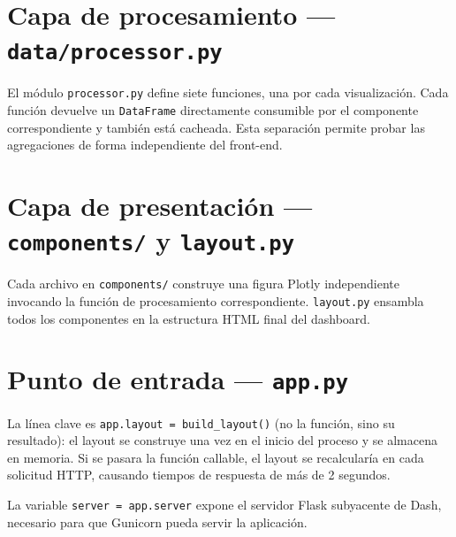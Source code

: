 \documentclass[a4paper,12pt]{report}
\numberwithin{equation}{chapter}
\numberwithin{figure}{chapter}
\numberwithin{table}{chapter}
\begin{document}


\section{Capa de procesamiento — \texttt{data/processor.py}}

El módulo \texttt{processor.py} define siete funciones, una por cada visualización. Cada función devuelve un \texttt{DataFrame} directamente consumible por el componente correspondiente y también está cacheada. Esta separación permite probar las agregaciones de forma independiente del front-end.



\section{Capa de presentación — \texttt{components/} y \texttt{layout.py}}

Cada archivo en \texttt{components/} construye una figura Plotly independiente invocando la función de procesamiento correspondiente. \texttt{layout.py} ensambla todos los componentes en la estructura HTML final del dashboard.

\section{Punto de entrada — \texttt{app.py}}



La línea clave es \texttt{app.layout = build\_layout()} (no la función, sino su resultado): el layout se construye una vez en el inicio del proceso y se almacena en memoria. Si se pasara la función callable, el layout se recalcularía en cada solicitud HTTP, causando tiempos de respuesta de más de 2 segundos.

La variable \texttt{server = app.server} expone el servidor Flask subyacente de Dash, necesario para que Gunicorn pueda servir la aplicación.
\end{document}
